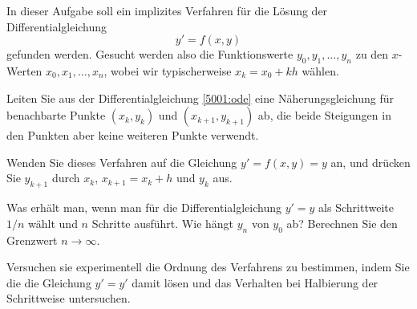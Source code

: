 In dieser Aufgabe soll ein implizites Verfahren für die Lösung der
Differentialgleichung
\begin{equation}
y'=f(x,y)
\label{5001:ode}
\end{equation}
gefunden werden.
Gesucht werden also die Funktionswerte $y_0,y_1,\dots,y_n$ zu den
$x$-Werten $x_0,x_1,\dots,x_n$, wobei wir typischerweise $x_k = x_0+kh$ 
wählen.
\begin{teilaufgaben}
\item
Leiten Sie aus der Differentialgleichung \eqref{5001:ode}
eine Näherungsgleichung für benachbarte Punkte $(x_k,y_k)$ und
$(x_{k+1},y_{k+1})$ ab, die beide Steigungen in den Punkten aber keine
weiteren Punkte verwendt.
\item
Wenden Sie dieses Verfahren auf die Gleichung $y'=f(x,y)=y$ an, und
drücken Sie $y_{k+1}$ durch $x_k$, $x_{k+1}=x_k+h$ und $y_{k}$ aus.
\item
Was erhält man, wenn man für die Differentialgleichung $y'=y$
als Schrittweite $1/n$ wählt und $n$ Schritte ausführt.
Wie hängt $y_n$ von $y_0$ ab?
Berechnen Sie den Grenzwert $n\to\infty$.
\item
Versuchen sie experimentell die Ordnung des Verfahrens zu bestimmen,
indem Sie die die Gleichung $y'=y'$ damit lösen und das Verhalten bei
Halbierung der Schrittweise untersuchen.
\end{teilaufgaben}


